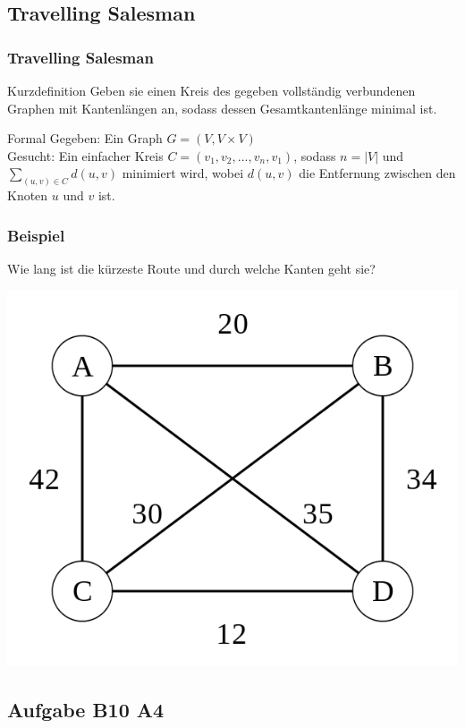 \subsection{Travelling Salesman}
\begin{frame}
	\frametitle{Travelling Salesman}
	\begin{block}{Kurzdefinition}
	Geben sie einen Kreis des gegeben vollständig verbundenen Graphen mit Kantenlängen an, sodass dessen Gesamtkantenlänge minimal ist.
	\end{block}
	\begin{block}{Formal}
	Gegeben: Ein Graph $G=(V,V \times V)$\\
	Gesucht: Ein einfacher Kreis $C=(v_1,v_2,...,v_n,v_1)$, sodass $n=|V|$ und $\sum_{(u,v)\in C} d(u,v)$ minimiert wird, wobei $d(u,v)$ die Entfernung zwischen den Knoten $u$ und $v$ ist.\\
	\end{block}
\end{frame}
\begin{frame}
	\frametitle{Beispiel}
	Wie lang ist die kürzeste Route und durch welche Kanten geht sie?
	\begin{center}		
		\includegraphics[scale=0.5]{images/Weighted_K4}
	\end{center}
\end{frame}
\subsection{Aufgabe B10 A4}

